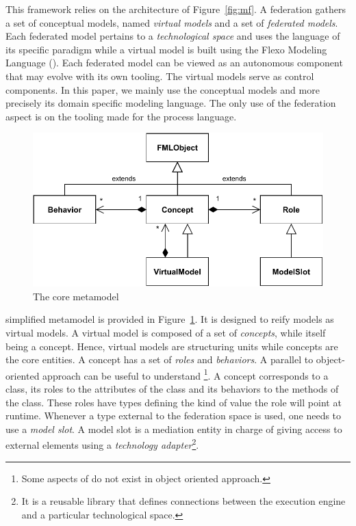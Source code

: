 This framework relies on the architecture of Figure~\ref{fig:mf}. A federation
gathers a set of conceptual models, named \emph{virtual models} and a
set of \emph{federated models}. Each federated model pertains to a
\emph{technological space} and uses the language of its specific
paradigm while a virtual model is built using the Flexo Modeling
Language (\FML). Each federated model can be viewed as an autonomous
component that may evolve with its own tooling. The virtual models
serve as control components.
In this paper, we mainly use the conceptual models and more precisely \FML its domain specific modeling language. The only use of the federation aspect is on the tooling made for the process language.

\begin{figure}[t]
    \centering
    \includegraphics[width=\columnwidth]{Figures/FMLCoreModel.pdf}
    \caption{The \FML core metamodel}
    \label{fig:mm}
\end{figure}

\FML simplified metamodel is provided in Figure~\ref{fig:mm}. It is designed to reify models as virtual models. A virtual model
is composed of a set of \emph{concepts}, while itself being a concept.
Hence, virtual models are structuring units while concepts are the
core entities. A concept has a set of \emph{roles} and
\emph{behaviors}. A parallel to object-oriented approach can be useful
to understand \FML\footnote{Some aspects of \FML do not exist in object oriented approach.}. A concept corresponds to a class, its roles to the
attributes of the class and its behaviors to the methods of the class.
These roles have types defining the kind of value the role will point
at runtime.
Whenever a type external to the federation space is used, one needs to use a \emph{model slot}. A model
slot is a mediation entity in charge of giving
access to external elements using
a \emph{technology adapter}\footnote{It is a reusable library that defines
connections between the \FML execution engine and a particular
technological space.}.


